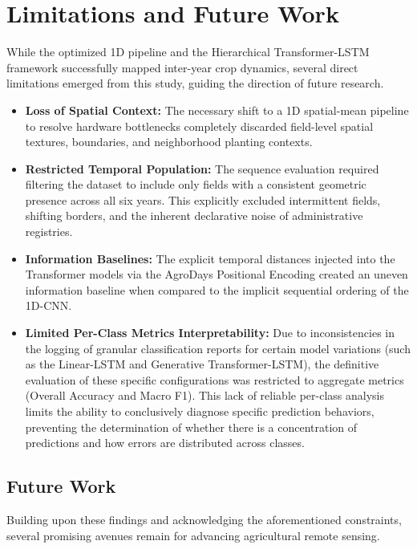 \section{Limitations and Future Work}
\label{sec:future_work}

While the optimized 1D pipeline and the Hierarchical Transformer-LSTM framework successfully mapped inter-year crop dynamics,
several direct limitations emerged from this study, guiding the direction of future research.

\begin{itemize}
    \item \textbf{Loss of Spatial Context:}
        The necessary shift to a 1D spatial-mean pipeline to resolve hardware bottlenecks completely discarded field-level spatial textures,
        boundaries, and neighborhood planting contexts.
    \item \textbf{Restricted Temporal Population:}
        The sequence evaluation required filtering the dataset to include only fields with a consistent geometric presence across all six years.
        This explicitly excluded intermittent fields, shifting borders, and the inherent declarative noise of administrative registries.
    \item \textbf{Information Baselines:}
        The explicit temporal distances injected into the Transformer models via the AgroDays Positional Encoding created
        an uneven information baseline when compared to the implicit sequential ordering of the 1D-CNN.
    \item \textbf{Limited Per-Class Metrics Interpretability:}
        Due to inconsistencies in the logging of granular classification reports for certain model variations (such as the Linear-LSTM and Generative Transformer-LSTM),
        the definitive evaluation of these specific configurations was restricted to aggregate metrics (Overall Accuracy and Macro F1).
        This lack of reliable per-class analysis limits the ability to conclusively diagnose specific prediction behaviors,
        preventing the determination of whether there is a concentration of predictions and how errors are distributed across classes.
\end{itemize}

\subsection{Future Work}
\label{subsec:future_directions}

Building upon these findings and acknowledging the aforementioned constraints,
several promising avenues remain for advancing agricultural remote sensing.

